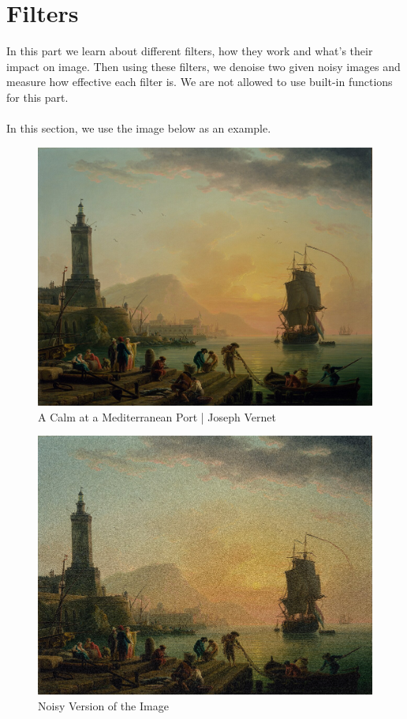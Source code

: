 \documentclass[hidelinks,12pt]{article}
\begin{document}
	
	
	\pagebreak
	
	
	\section{Filters}
	In this part we learn about different filters, how they work and what’s their impact on image. Then using these filters, we denoise two given noisy images and measure how effective each filter is. We are not allowed to use built-in functions for this part.
	\\ \\
	 In this section, we use the image below as an example.
	\begin{figure}[bh!]
		\centering
		\includegraphics[scale=0.22]{figures/A_Calm_at_a_Mediterranean_Port.jpg}
		\caption{A Calm at a Mediterranean Port | Joseph Vernet}
	\end{figure}
	
	\begin{figure}[bh!]
		\centering
		\includegraphics[scale=0.22]{figures/A_Calm_at_a_Mediterranean_Port_noisy.png}
		\caption{Noisy Version of the Image}
		\label{fig:noisy_painting}
	\end{figure}
	
\end{document}
